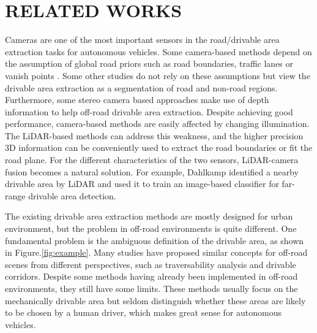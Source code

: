 \documentclass[letterpaper, 10 pt, conference]{ieeeconf}  %
\begin{document}
\section{RELATED WORKS}	\label{sec:relatedworks}
Cameras are one of the most important sensors in the road/drivable area extraction tasks for autonomous vehicles. Some camera-based methods depend on the assumption of global road priors such as road boundaries\cite{Yuan2015},
traffic lanes\cite{Aly2014}\cite{ZuWhanKim2008} or
vanish points\cite{Alvarez2014}\cite{Audibert2010}
. Some other studies do not rely on these assumptions but view the drivable area extraction as a segmentation of road and non-road regions\cite{Mei2018}\cite{Zhou2010}. Furthermore, some stereo camera based approaches\cite{rankin2009stereo}\cite{broggi2013terrain} make use of depth information to help off-road drivable area extraction.
Despite achieving good performance, camera-based methods are easily affected by changing illumination. 
The LiDAR-based methods can address this weakness, and the higher precision 3D information can be conveniently used to extract the road boundaries\cite{Zhang2010}\cite{Wijesoma2004}\cite{Zhang2018} or fit the road plane\cite{Asvadi2016}\cite{Hu2014}. For the different characteristics of the two sensors, LiDAR-camera fusion becomes a natural solution. For example, Dahlkamp\cite{Stanford2006} identified a nearby drivable area by LiDAR and used it to train an image-based classifier for far-range drivable area detection.

The existing drivable area extraction methods are mostly designed for urban environment, but the problem in off-road environments is quite different. One fundamental problem is the ambiguous definition of the drivable area, as shown in Figure.\ref{fig:example}. Many studies have proposed similar concepts for off-road scenes from different perspectives, such as traversability analysis\cite{Suger2015} and drivable corridors\cite{Nefian2006}.
Despite some methods having already been implemented in off-road environments\cite{Audibert2010}\cite{Stanford2006}\cite{Nefian2006}, they still have some limits. These methods usually focus on the mechanically drivable area but seldom distinguish whether these areas are likely to be chosen by a human driver, which makes great sense for autonomous vehicles.
\end{document}
